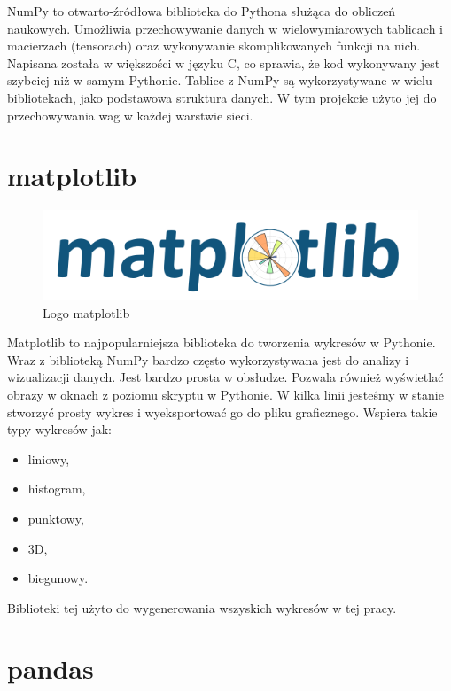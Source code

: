     NumPy to otwarto-źródłowa biblioteka do Pythona służąca do obliczeń naukowych.
    Umożliwia przechowywanie danych w wielowymiarowych tablicach i macierzach (tensorach) oraz wykonywanie skomplikowanych funkcji na nich.
    Napisana została w większości w języku C, co sprawia, że kod wykonywany jest szybciej niż w samym Pythonie.
    Tablice z NumPy są wykorzystywane w wielu bibliotekach, jako podstawowa struktura danych.
    W tym projekcie użyto jej do przechowywania wag w każdej warstwie sieci.

    \section{matplotlib}\label{sec:matplotlib}

    \begin{figure}[htp]
        \centering
        \includegraphics[scale=0.4]{./img/matplotlib-logo.png}
        \caption{Logo matplotlib}
    \end{figure}

    Matplotlib to najpopularniejsza biblioteka do tworzenia wykresów w Pythonie.
    Wraz z biblioteką NumPy bardzo często wykorzystywana jest do analizy i wizualizacji danych.
    Jest bardzo prosta w obsłudze.
    Pozwala również wyświetlać obrazy w oknach z poziomu skryptu w Pythonie.
    W kilka linii jesteśmy w stanie stworzyć prosty wykres i wyeksportować go do pliku graficznego.
    Wspiera takie typy wykresów jak:

    \begin{itemize}
        \item liniowy,
        \item histogram,
        \item punktowy,
        \item 3D,
        \item biegunowy.
    \end{itemize}

    Biblioteki tej użyto do wygenerowania wszyskich wykresów w tej pracy.

    \section{pandas}\label{sec:pandas}

